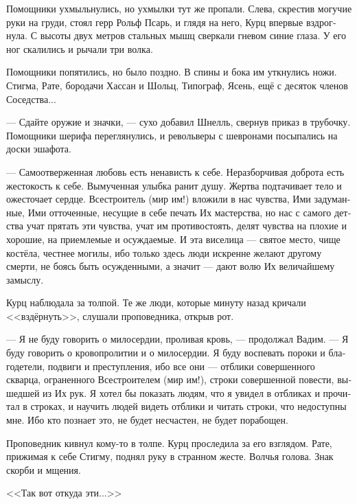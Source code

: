 \documentclass[a4paper,12pt,fleqn]{book}\usepackage{polyglossia}\setdefaultlanguage[babelshorthands=true]{russian}\setotherlanguage{english}\defaultfontfeatures{Ligatures=TeX,Mapping=tex-text}\usepackage{xcolor}\newcommand{\ml}[3]{#2}
\newcommand{\textspace}{\vspace{1em}{\centering\Large\bfseries<...>\par}\vspace{1em}}
\begin{document}
Помощники ухмыльнулись, но ухмылки тут же пропали.
Слева, скрестив могучие руки на груди, стоял герр Рольф Псарь, и глядя на него, Курц впервые вздрогнула.
С высоты двух метров стальных мышц сверкали гневом синие глаза.
У его ног скалились и рычали три волка.

Помощники попятились, но было поздно.
В спины и бока им уткнулись ножи.
\ml{$0$}
{Стигма, Рате, бородачи Хассан и Шольц, Типограф, Ясень, ещё с десяток членов Соседства...}
{Stigma, Rate, beards Hassan and Scholz, Printer, Ash, about a dozen of Neighbourhood ....}

\ml{$0$}
{--- Сдайте оружие и значки, --- сухо добавил Шнелль, свернув приказ в трубочку.}
{``Surrender your weapons and badges,'' Schnell coldly added and rolled up the paper.}
Помощники шерифа переглянулись, и револьверы с шевронами посыпались на доски эшафота.

\textspace

--- Самоотверженная любовь есть ненависть к себе.
Неразборчивая доброта есть жестокость к себе.
Вымученная улыбка ранит душу.
Жертва подтачивает тело и ожесточает сердце.
Всестроитель (мир им!) вложили в нас чувства, Ими задуманные, Ими отточенные, несущие в себе печать Их мастерства, но нас с самого детства учат прятать эти чувства, учат им противостоять, делят чувства на плохие и хорошие, на приемлемые и осуждаемые.
И эта виселица --- святое место, чище костёла, честнее могилы, ибо только здесь люди искренне желают другому смерти, не боясь быть осужденными, а значит --- дают волю Их величайшему замыслу.

Курц наблюдала за толпой.
Те же люди, которые минуту назад кричали <<вздёрнуть>>, слушали проповедника, открыв рот.

--- Я не буду говорить о милосердии, проливая кровь, --- продолжал Вадим.
--- Я буду говорить о кровопролитии и о милосердии.
Я буду воспевать пороки и благодетели, подвиги и преступления, ибо все они --- отблики совершенного скварца, ограненного Всестроителем (мир им!), строки совершенной повести, вышедшей из Их рук.
Я хотел бы показать людям, что я увидел в отбликах и прочитал в строках, и научить людей видеть отблики и читать строки, что недоступны мне.
Ибо кто познает это, не будет несчастен, не будет порабощен.

Проповедник кивнул кому-то в толпе.
Курц проследила за его взглядом.
Рате, прижимая к себе Стигму, поднял руку в странном жесте.
Волчья голова.
Знак скорби и мщения.

<<Так вот откуда эти...>>
\end{document}
